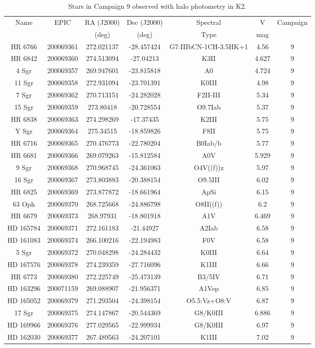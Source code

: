 \begin{table*}
\caption{Stars in Campaign 9 observed with halo photometry in K2.\label{table_1}}
\begin{tabular}{ccccccc}
\hline \hline
Name & EPIC & RA (J2000) & Dec (J2000) & Spectral & V & Campaign \\
 &  & (deg) & (deg) & Type & mag &  \\
\hline
HR 6766 & 200069361 & 272.021137 & -28.457424 & G7:IIIbCN-1CH-3.5HK+1 & 4.56 & 9 \\
HR 6842 & 200069360 & 274.513094 & -27.04213 & K3II & 4.627 & 9 \\
4 Sgr & 200069357 & 269.947601 & -23.815818 & A0 & 4.724 & 9 \\
11 Sgr & 200069358 & 272.931094 & -23.701391 & K0III & 4.98 & 9 \\
7 Sgr & 200069362 & 270.713151 & -24.282028 & F2II-III & 5.34 & 9 \\
15 Sgr & 200069359 & 273.80418 & -20.728554 & O9.7Iab & 5.37 & 9 \\
HR 6838 & 200069363 & 274.298269 & -17.37435 & K2III & 5.75 & 9 \\
Y Sgr & 200069364 & 275.34515 & -18.859826 & F8II & 5.75 & 9 \\
HR 6716 & 200069365 & 270.476773 & -22.780204 & B0Iab/b & 5.77 & 9 \\
HR 6681 & 200069366 & 269.079263 & -15.812584 & A0V & 5.929 & 9 \\
9 Sgr & 200069368 & 270.968745 & -24.361063 & O4V((f))z & 5.97 & 9 \\
16 Sgr & 200069367 & 273.803883 & -20.388154 & O9.5III & 6.02 & 9 \\
HR 6825 & 200069369 & 273.877872 & -18.661964 & ApSi & 6.15 & 9 \\
63 Oph & 200069370 & 268.725668 & -24.886798 & O8II((f)) & 6.2 & 9 \\
HR 6679 & 200069373 & 268.97931 & -18.801918 & A1V & 6.469 & 9 \\
HD 165784 & 200069371 & 272.161183 & -21.44927 & A2Iab & 6.58 & 9 \\
HD 161083 & 200069374 & 266.100216 & -22.194983 & F0V & 6.58 & 9 \\
5 Sgr & 200069372 & 270.048298 & -24.284432 & K0III & 6.64 & 9 \\
HD 167576 & 200069378 & 274.239359 & -27.716096 & K1III & 6.66 & 9 \\
HR 6773 & 200069380 & 272.225749 & -25.473139 & B3/5IV & 6.71 & 9 \\
HD 163296 & 200071159 & 269.088907 & -21.956371 & A1Vep & 6.85 & 9 \\
HD 165052 & 200069379 & 271.293504 & -24.398154 & O5.5:Vz+O8:V & 6.87 & 9 \\
17 Sgr & 200069375 & 274.147867 & -20.544369 & G8/K0III & 6.886 & 9 \\
HD 169966 & 200069376 & 277.029565 & -22.999934 & G8/K0III & 6.97 & 9 \\
HD 162030 & 200069377 & 267.489563 & -24.207101 & K1III & 7.02 & 9 \\
\hline
\end{tabular}
\end{table*}
